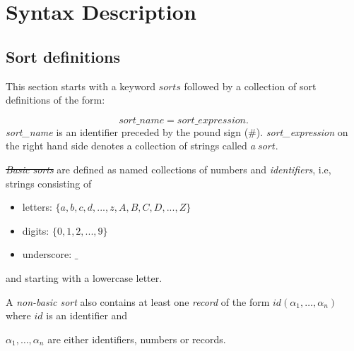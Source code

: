 \documentclass[12pt, letterpaper]{article}
\begin{document}
\section{Syntax Description}\label{syntax}


\subsection{Sort definitions}\label{ss}


This section starts with a keyword $sorts$ followed by a collection of sort definitions of the form: 

\begin{equation*}
  sort\_name=sort\_expression.
\end{equation*}
\textit{sort\_name} is an identifier preceded by the pound sign (\#).
\textit{sort\_expression}  on the right hand side denotes a collection of strings called $a~sort$.



\st \textit{Basic sorts} are defined as named collections of numbers and \textit{identifiers}, i.e, strings consisting of

\begin{itemize}

 \item letters: $\{a,b,c,d,...,z,A,B,C,D,...,Z\}$

 \item digits: $\{0,1,2,...,9\}$

 \item underscore: $\_$

\end{itemize}

and starting with a lowercase letter.


\medskip\noindent
A \textit{non-basic sort} also contains at least one \textit{record} of the form $id(\alpha_1,\dots, \alpha_n)$ where $id$ is an identifier and 

$\alpha_1, \dots, \alpha_n$ are either identifiers, numbers or records. 
\end{document}
